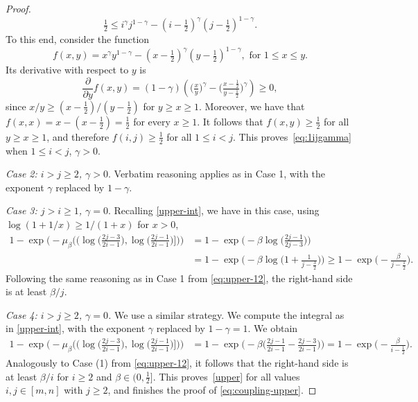 \documentclass[a4paper, a4wide, 10pt, reqno]{amsart}
\theoremstyle{plain}
\theoremstyle{definition}
\numberwithin{equation}{section}
\begin{document}
\begin{proof}
\begin{equation}
    \tfrac12 \le i^\gamma j^{1-\gamma}- (i-\tfrac12 )^{\gamma} (j-\tfrac12 )^{1-\gamma}.
    \end{equation}
    To this end, consider the function 
    $$
    f(x,y) = x^\gamma y^{1-\gamma} - (x-\tfrac12 )^\gamma(y-\tfrac12 )^{1-\gamma}, 
    \text{ for $1\le x\le y$.}  $$
    Its derivative with respect to $y$ is
    \[
    \frac{\partial}{\partial y}f(x,y) = (1-\gamma)\left(\big(\tfrac x y\big)^\gamma - \big(\tfrac{x-\frac12 }{y-\frac12 }\big)^{\gamma}\right) \ge 0,   
    \]
    since $x/y \ge (x-\tfrac12 )/(y-\tfrac12 )$ for $y\ge x\ge 1$. Moreover, we have that
    $
    f(x,x) = x - (x-\tfrac12 ) = \tfrac12 
    $
    for every $x\ge 1$.
    It follows that $f(x,y) \ge \tfrac12 $ for all $y\ge x\ge 1$, and therefore $f(i,j) \ge \tfrac{1}{2}$ for all $1\le i<j$. This proves~\eqref{eq:1ijgamma} when $1\le i<j$, $\gamma>0$.

    \smallskip 
    \noindent\emph{Case 2: $i\!>\!j\ge\! 2$, $\gamma>0$}. Verbatim reasoning applies as in Case 1, with the exponent  $\gamma$ replaced by $1\!-\!\gamma$.

    
    \smallskip 
    \noindent\emph{Case 3: $j>i\ge 1$, $\gamma=0$}. Recalling \eqref{upper-int}, we have in this case, using $\log(1+1/x)\ge 1/(1+x)$ for $x>0$,
    \begin{align*}
    1-\exp\Big(-\mu_\beta \Big( (\log \big(\tfrac{2j-3}{2i-1}\big), \log \big(\tfrac{2j-1}{2i-1}\big) \big]\Big)\Big)
    &= 1-\exp\Big(-\beta\log\big(\tfrac{2j-1}{2j-3}\big)\Big) \\
    &= 1-\exp\Big(-\beta\log\big(1+\tfrac{1}{j-\frac32}\big)\Big) 
    \ge 1-\exp\Big(-\tfrac{\beta}{j-\frac12 }\Big).
    \end{align*}
    Following the same reasoning as in Case 1 from \eqref{eq:upper-12}, the right-hand side is at least $\beta/j$.
    
    \smallskip 
    \noindent\emph{Case 4: $i>j\ge 2$, $\gamma=0$.}
    We use a similar strategy. We compute the integral as in \eqref{upper-int}, with the exponent $\gamma$ replaced by $1-\gamma=1$. We obtain
    \begin{align*}
    1-\exp\Big(-\mu_\beta \Big( (\log \big(\tfrac{2j-3}{2i-1}\big), \log \big(\tfrac{2j-1}{2i-1}\big) \big]\Big)\Big)
    &= 1-\exp\Big(-\beta \big(\tfrac{2j-1}{2i-1}-\tfrac{2j-3}{2i-1}\big)\Big) = 1-\exp\big(-\tfrac{\beta}{i-\frac12 }\big).
    \end{align*}
    Analogously to Case (1) from \eqref{eq:upper-12}, it follows that the right-hand side is at least $\beta/i$ for $i\ge 2$ and $\beta\in(0, \tfrac12 ]$.    This proves~\eqref{upper} for all values $i,j\in[m,n]$ with $j\ge 2$, and finishes the proof of \eqref{eq:coupling-upper}. 
\end{proof}
\end{document}
